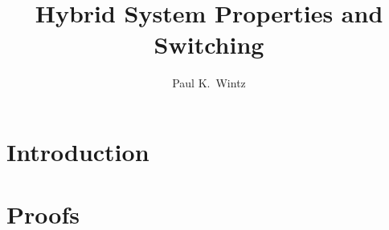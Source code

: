 \documentclass[11pt]{ucthesis}
\begin{document}



\title{Hybrid System Properties and Switching}
\author{Paul K.\ Wintz}
\deanlineone{}
\deanlinetwo{}
\deanlinethree{}

\begin{frontmatter}

\maketitle

\tableofcontents
\listoffigures

\begin{abstract}

\end{abstract}



\end{frontmatter}

\chapter{Introduction} \label{sec:Introduction}


\appendix

\chapter{Proofs} \label{sec:AppendixA}
% 

\nocite{goebel_hybrid_2012}
\printbibliography{}
\end{document}

